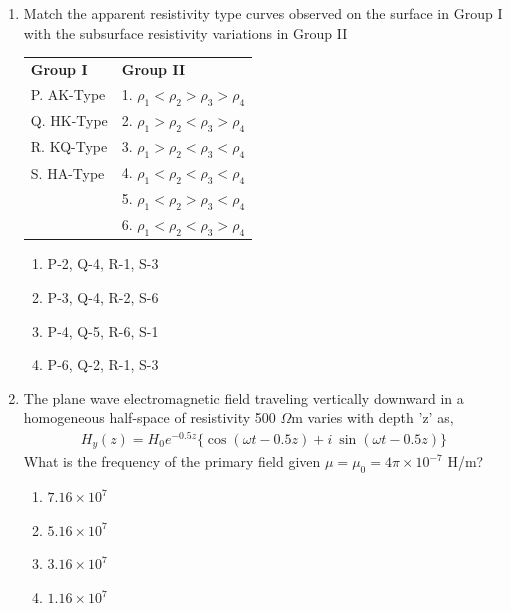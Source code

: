 \documentclass[journal,12pt,onecolumn]{IEEEtran}
\theoremstyle{remark}
\begin{document}
\begin{enumerate}
    \item Match the apparent resistivity type curves observed on the surface in Group I with the subsurface resistivity variations in Group II

    \hfill{}
    
    \begin{tabular}{ll}
        \textbf{Group I} & \textbf{Group II} \\
        P. AK-Type & 1. $\rho_{1}<\rho_{2}>\rho_{3}>\rho_{4}$ \\
        Q. HK-Type & 2. $\rho_{1}>\rho_{2}<\rho_{3}>\rho_{4}$ \\
        R. KQ-Type & 3. $\rho_{1}>\rho_{2}<\rho_{3}<\rho_{4}$ \\
        S. HA-Type & 4. $\rho_{1}<\rho_{2}<\rho_{3}<\rho_{4}$ \\
        & 5. $\rho_{1}<\rho_{2}>\rho_{3}<\rho_{4}$ \\
        & 6. $\rho_{1}<\rho_{2}<\rho_{3}>\rho_{4}$ \\
    \end{tabular}
    
    \begin{multicols}{2}
        \begin{enumerate}
            \item P-2, Q-4, R-1, S-3
            \item P-3, Q-4, R-2, S-6
            \item P-4, Q-5, R-6, S-1
            \item P-6, Q-2, R-1, S-3
        \end{enumerate}
    \end{multicols}

\newpage

    \item The plane wave electromagnetic field traveling vertically downward in a homogeneous half-space of resistivity 500 $\Omega$m varies with depth 'z' as,
    \begin{align*}
    H_{y}(z)=H_{0}e^{-0.5z}\{\cos(\omega t-0.5z)+i~\sin(\omega t-0.5z)\}
    \end{align*}
    What is the frequency  of the primary field given $\mu=\mu_{0}=4\pi\times10^{-7}$ H/m?

    \hfill{}
    
    \begin{multicols}{2}
        \begin{enumerate}
            \item $7.16\times10^{7}$
            \item $5.16\times10^{7}$
            \item $3.16\times10^{7}$
            \item $1.16\times10^{7}$
        \end{enumerate}
    \end{multicols}


\end{enumerate}
\end{document}
